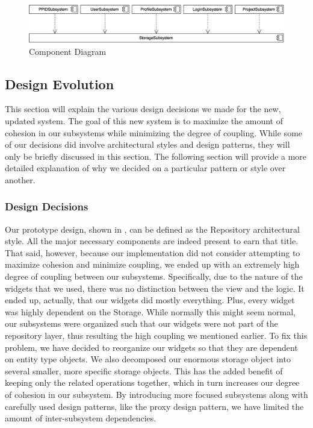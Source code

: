 \documentclass[12pt,letterpaper]{article}
\begin{document}
\begin{figure}[H]
	\centering{}
	\includegraphics[scale=0.27]{imgs/d3/decomp/component-diagram.png}
	\caption{Component Diagram}
\end{figure}

\subsection{Design Evolution}

This section will explain the various design decisions we made for the new, updated system. The goal of this new system is to maximize the amount of cohesion in our subsystems while minimizing the degree of coupling. While some of our decisions did involve architectural styles and design patterns, they will only be briefly discussed in this section. The following section will provide a more detailed explanation of why we decided on a particular pattern or style over another.

\subsubsection{Design Decisions}

Our prototype design, shown in , can be defined as the Repository architectural style. All the major necessary components are indeed present to earn that title. That said, however, because our implementation did not consider attempting to maximize cohesion and minimize coupling, we ended up with an extremely high degree of coupling between our subsystems. Specifically, due to the nature of the widgets that we used, there was no distinction between the view and the logic. It ended up, actually, that our widgets did mostly everything. Plus, every widget was highly dependent on the Storage. While normally this might seem normal, our subsystems were organized such that our widgets were not part of the repository layer, thus resulting the high coupling we mentioned earlier. To fix this problem, we have decided to reorganize our widgets so that they are dependent on entity type objects. We also decomposed our enormous storage object into several smaller, more specific storage objects. This has the added benefit of keeping only the related operations together, which in turn increases our degree of cohesion in our subsystem. By introducing more focused subsystems along with carefully used design patterns, like the proxy design pattern, we have limited the amount of inter-subsystem dependencies.
\end{document}
